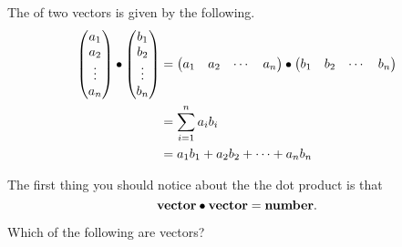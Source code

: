 \documentclass{ximera}
\begin{document}
 \begin{definition}
  The  of two vectors is given by the following.
  \begin{align*}
  \begin{pmatrix}
    a_1\\
    a_2\\
    \vdots\\
    a_n
  \end{pmatrix}
  \bullet
  \begin{pmatrix}
    b_1\\
    b_2\\
    \vdots\\
    b_n
  \end{pmatrix}
  &=\begin{pmatrix} a_1 & a_2 & \cdots & a_n\end{pmatrix}\bullet\begin{pmatrix} b_1 & b_2 & \cdots & b_n\end{pmatrix}\\
  &= \sum_{i=1}^n a_ib_i\\
  &= a_1b_1 + a_2b_2 +\dots+a_nb_n
  \end{align*}
\end{definition}

The first thing you should notice about the the dot product is that
\[
\mathbf{vector}\bullet \mathbf{vector} = \mathbf{number}.
\]


\begin{question}
  Which of the following are vectors?
  \begin{selectAll}
    \pdfOnly{\end{multicols}}
    \end{selectAll}
\end{question}
\end{document}
